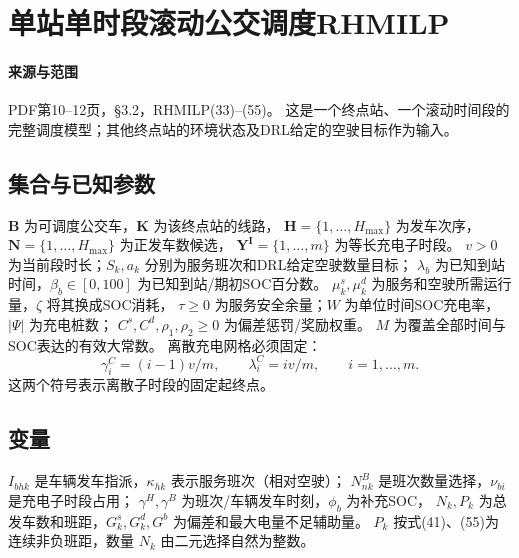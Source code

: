 \documentclass[UTF8,11pt]{ctexart}
\begin{document}
\section*{单站单时段滚动公交调度RHMILP}

\paragraph{来源与范围} PDF第10--12页，§3.2，RHMILP(33)--(55)。
这是一个终点站、一个滚动时间段的完整调度模型；其他终点站的环境状态及DRL给定的空驶目标作为输入。
\subsection*{集合与已知参数}
$\mathbf B$ 为可调度公交车，$\mathbf K$ 为该终点站的线路，
$\mathbf H=\{1,\ldots,H_{\max}\}$ 为发车次序，
$\mathbf N=\{1,\ldots,H_{\max}\}$ 为正发车数候选，
$\mathbf Y^{\mathbf I}=\{1,\ldots,m\}$ 为等长充电子时段。
$v>0$ 为当前段时长；$S_k,a_k$ 分别为服务班次和DRL给定空驶数量目标；
$\lambda_b$ 为已知到站时间，$\beta_b\in[0,100]$ 为已知到站/期初SOC百分数。
$\mu_k^s,\mu_k^d$ 为服务和空驶所需运行量，$\zeta$ 将其换成SOC消耗，
$\tau\ge0$ 为服务安全余量；$W$ 为单位时间SOC充电率，$|\Psi|$ 为充电桩数；
$C^s,C^d,\rho_1,\rho_2\ge0$ 为偏差惩罚/奖励权重。
$M$ 为覆盖全部时间与SOC表达的有效大常数。
离散充电网格必须固定：
\[
\gamma_i^C=(i-1)v/m,\qquad \lambda_i^C=iv/m,\qquad i=1,\ldots,m.
\]
这两个符号表示离散子时段的固定起终点。
\subsection*{变量}
$I_{bhk}$ 是车辆发车指派，$\kappa_{hk}$ 表示服务班次（相对空驶）；
$N^B_{nk}$ 是班次数量选择，$\nu_{bi}$ 是充电子时段占用；
$\gamma^H,\gamma^B$ 为班次/车辆发车时刻，$\phi_b$ 为补充SOC，
$N_k,P_k$ 为总发车数和班距，$G_k^s,G_k^d,G^b$ 为偏差和最大电量不足辅助量。
$P_k$ 按式(41)、(55)为连续非负班距，数量 $N_k$ 由二元选择自然为整数。
\end{document}
